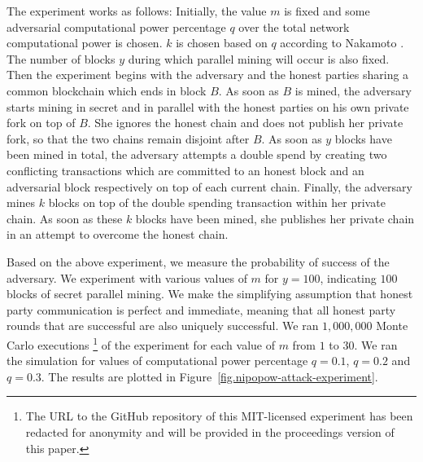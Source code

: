 The experiment works as follows: Initially, the value $m$ is fixed and some
adversarial computational power percentage $q$ over the total network
computational power is chosen. $k$ is chosen based on $q$ according to Nakamoto
\cite{bitcoin}. The number of blocks $y$ during which parallel mining will
occur is also fixed. Then the experiment begins with the adversary and the
honest parties sharing a common blockchain which ends in block $B$. As soon as
$B$ is mined, the adversary starts mining in secret and in parallel with the
honest parties on his own private fork on top of $B$. She ignores the honest
chain and does not publish her private fork, so that the two chains remain
disjoint after $B$. As soon as $y$ blocks have been mined in total, the
adversary attempts a double spend by creating two conflicting transactions
which are committed to an honest block and an adversarial block respectively on
top of each current chain. Finally, the adversary mines $k$ blocks on top of
the double spending transaction within her private chain. As soon as these $k$
blocks have been mined, she publishes her private chain in an attempt to
overcome the honest chain.

Based on the above experiment, we measure the probability of success of the
adversary. We experiment
with various values of $m$ for $y = 100$, indicating $100$ blocks of secret
parallel mining. We make the simplifying assumption that honest party
communication is perfect and immediate, meaning that all honest party rounds
that are successful are also uniquely successful. We ran $1,000,000$ Monte
Carlo executions \footnote{The URL to the GitHub repository of this
MIT-licensed experiment has been redacted for anonymity and will be provided in
the proceedings version of this paper.} of the experiment for each value of $m$
from $1$ to $30$. We ran the simulation for values of computational power
percentage $q = 0.1$, $q = 0.2$ and $q = 0.3$. The results are plotted in
Figure~\ref{fig.nipopow-attack-experiment}.

